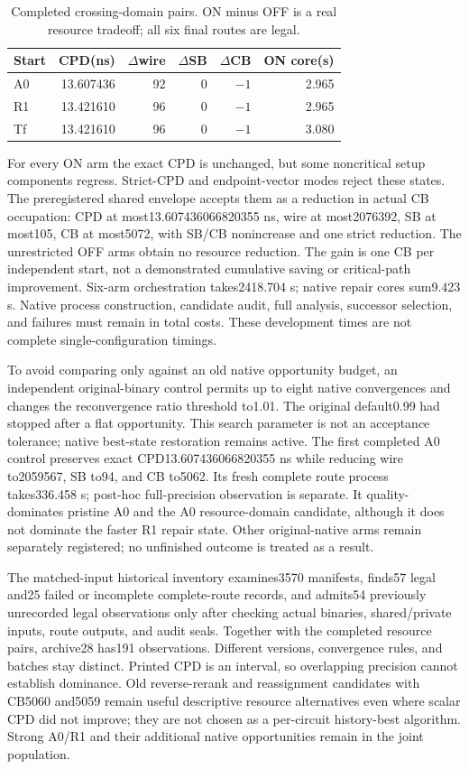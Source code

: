 \begin{table}[t]
\centering\scriptsize
\caption{Completed crossing-domain pairs. ON minus OFF is a real resource tradeoff; all six final routes are legal.}
\begin{tabular}{lrrrrr}
\hline
Start & CPD(ns) & $\Delta$wire & $\Delta$SB & $\Delta$CB & ON core(s)\\
\hline
A0 &13.607436&92&0&$-1$&2.965\\
R1 &13.421610&96&0&$-1$&2.965\\
Tf &13.421610&96&0&$-1$&3.080\\
\hline
\end{tabular}
\end{table}
For every ON arm the exact CPD is unchanged, but some noncritical setup components regress. Strict-CPD and endpoint-vector modes reject these states. The preregistered shared envelope accepts them as a reduction in actual CB occupation: CPD at most13.607436066820355 ns, wire at most2076392, SB at most105, CB at most5072, with SB/CB nonincrease and one strict reduction. The unrestricted OFF arms obtain no resource reduction. The gain is one CB per independent start, not a demonstrated cumulative saving or critical-path improvement. Six-arm orchestration takes2418.704 s; native repair cores sum9.423 s. Native process construction, candidate audit, full analysis, successor selection, and failures must remain in total costs. These development times are not complete single-configuration timings.

To avoid comparing only against an old native opportunity budget, an independent original-binary control permits up to eight native convergences and changes the reconvergence ratio threshold to1.01. The original default0.99 had stopped after a flat opportunity. This search parameter is not an acceptance tolerance; native best-state restoration remains active. The first completed A0 control preserves exact CPD13.607436066820355 ns while reducing wire to2059567, SB to94, and CB to5062. Its fresh complete route process takes336.458 s; post-hoc full-precision observation is separate. It quality-dominates pristine A0 and the A0 resource-domain candidate, although it does not dominate the faster R1 repair state. Other original-native arms remain separately registered; no unfinished outcome is treated as a result.

The matched-input historical inventory examines3570 manifests, finds57 legal and25 failed or incomplete complete-route records, and admits54 previously unrecorded legal observations only after checking actual binaries, shared/private inputs, route outputs, and audit seals. Together with the completed resource pairs, archive28 has191 observations. Different versions, convergence rules, and batches stay distinct. Printed CPD is an interval, so overlapping precision cannot establish dominance. Old reverse-rerank and reassignment candidates with CB5060 and5059 remain useful descriptive resource alternatives even where scalar CPD did not improve; they are not chosen as a per-circuit history-best algorithm. Strong A0/R1 and their additional native opportunities remain in the joint population.

